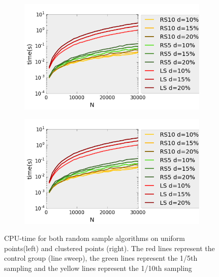 \begin{figure}[H] 
  \begin{subfigure}[b]{0.5\linewidth}
    \centering
    \includegraphics[width=0.9\linewidth]{Pictures/unif_ls_rs_t} 
    \label{fig:unif_ls_rs_t} 
    \vspace{4ex}
  \end{subfigure}%
  \begin{subfigure}[b]{0.5\linewidth}
    \centering
    \includegraphics[width=0.9\linewidth]{Pictures/unif_ls_rs_t} 
    \label{fig:clus_ls_rs_t} 
    \vspace{4ex}
  \end{subfigure}
  \caption{CPU-time for both random sample algorithms on uniform points(left) and clustered points (right). The red lines represent the control group (line sweep), the green lines represent the 1/5th sampling and the yellow lines represent the 1/10th sampling}
  \label{fig:ls_rs_t} 
\end{figure}

